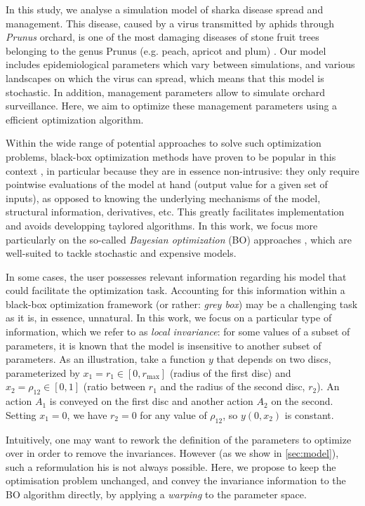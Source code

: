 In this study, we analyse a simulation model of sharka disease spread and management. This disease, caused by a virus transmitted by aphids through \textit{Prunus} orchard, 
is one of the most damaging diseases of stone fruit trees belonging to the genus Prunus (e.g. peach, apricot and plum) \cite{cambra2006plum,rimbaud2015sharka}.
Our model includes epidemiological parameters which vary between simulations, and various landscapes on which the virus can spread, which means that this model is stochastic. 
In addition, management parameters allow to simulate orchard surveillance. Here, we aim to optimize these management parameters using a efficient optimization algorithm.

Within the wide range of potential approaches to solve such optimization problems, black-box optimization methods have proven to be popular in this context \cite{rios2013derivative}, 
in particular because they are in essence non-intrusive: they only require pointwise evaluations of the model at hand (output value for a given set of inputs), 
as opposed to knowing the underlying mechanisms of the model, structural information, derivatives, etc. This greatly facilitates implementation and avoids developping taylored algorithms.
In this work, we focus more particularly on the so-called \textit{Bayesian optimization} (BO) approaches \cite{mockus2012bayesian,shahriari2016taking},
which are well-suited to tackle stochastic and expensive models.

In some cases, the user possesses relevant information regarding his model that could facilitate the optimization task.
Accounting for this information within a black-box optimization framework (or rather: \textit{grey box}) may be a challenging task
as it is, in essence, unnatural. In this work, we focus on a particular type of information, which we refer to as \textit{local invariance}:
for some values of a subset of parameters, it is known that the model is insensitive to another subset of parameters. 
As an illustration, take a function $y$ that depends on two discs, parameterized by $x_1=r_1 \in [0, r_{\max}]$ (radius of the first disc) and $x_2=\rho_{12} \in [0,1]$ 
(ratio between $r_1$ and the radius of the second disc, $r_2$). An action $A_1$ is conveyed on the first disc and another action $A_2$ on the second.
Setting $x_1=0$, we have $r_2=0$ for any value of $\rho_{12}$, so $y(0, x_2)$ is constant.

Intuitively, one may want to rework the definition of the parameters to optimize over in order
to remove the invariances. However (as we show in \ref{sec:model}), such a reformulation his is not always possible.
Here, we propose to keep the optimisation problem unchanged, and convey the invariance information to the BO algorithm directly, by applying 
a \textit{warping} \cite{snelson2004warped,snoek2014input} to the parameter space.


